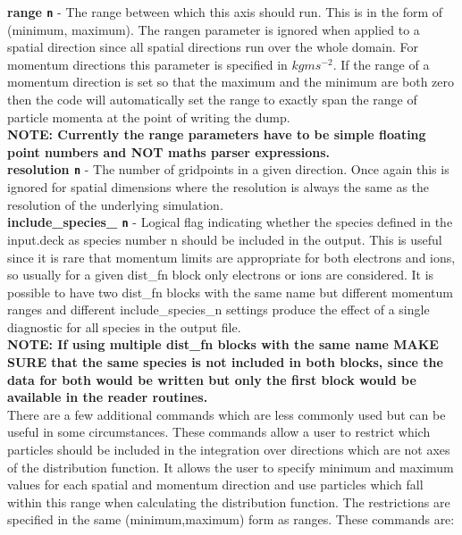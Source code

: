 \documentclass[12pt,a4paper]{article}
\newcommand{\emphtext}{\color{warwickdark} \fontfamily{phv}\selectfont\Large\bf}
\newcommand{\inlinecode}[1]{{\color{warwickred} \bf\texttt{#1}}}
\begin{document}
{\emphtext range\inlinecode{n}} - The range between which this axis should
run. This is in the form of (minimum, maximum). The rangen parameter is ignored
when applied to a spatial direction since all spatial directions run over
the whole domain. For momentum directions this parameter is specified in
$kgms^{-2}$. If the range of a momentum direction is set so that the maximum
and the minimum are both zero then the code will automatically set the range to
exactly span the range of particle momenta at the point of writing the dump.\\

{\emphtext NOTE: Currently the range parameters have to be simple floating
point numbers and NOT maths parser expressions.}\\

{\emphtext resolution\inlinecode{n}} - The number of gridpoints in a given
direction. Once again this is ignored for spatial dimensions where the
resolution is always the same as the resolution of the underlying simulation.\\

{\emphtext include\_species\_\inlinecode{n}} - Logical flag indicating whether
the species defined in the input.deck as species number n should be included
in the output. This is useful since it is rare that momentum limits are
appropriate for both electrons and ions, so usually for a given dist\_fn block
only electrons or ions are considered. It is possible to have two dist\_fn
blocks with the same name but different momentum ranges and different
include\_species\_n settings produce the effect of a single diagnostic for
all species in the output file.\\

{\emphtext NOTE: If using multiple dist\_fn blocks with the same name MAKE SURE
that the same species is not included in both blocks, since the data for both
would be written but only the first block would be available in the reader
routines.}\\

There are a few additional commands which are less commonly used but can be
useful in some circumstances. These commands allow a user to restrict which
particles should be included in the integration over directions which are not
axes of the distribution function. It allows the user to specify minimum and
maximum values for each spatial and momentum direction and use particles which
fall within this range when calculating the distribution function. The
restrictions are specified in the same (minimum,maximum) form as ranges. These
commands are:\\
\end{document}
